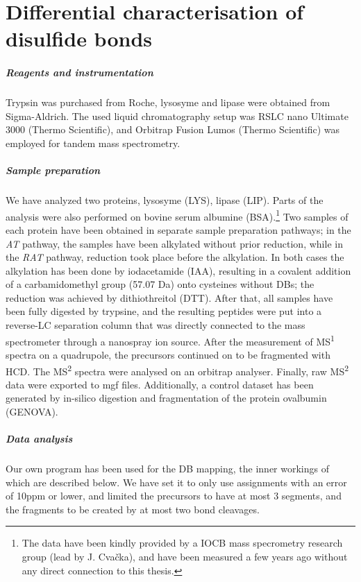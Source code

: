 \chapter{Differential characterisation of disulfide bonds}\label{chap:methods}

\paragraph{Reagents and instrumentation} Trypsin was purchased from Roche, lyso\-syme and lipase were obtained from Sigma-Aldrich. The used liquid chromatography setup was RSLC nano Ultimate 3000 (Thermo Scientific), and Orbitrap Fusion Lumos (Thermo Scientific) was employed for tandem mass spectrometry.

\paragraph{Sample preparation} We have analyzed two proteins, lysosyme (LYS), lipase (LIP). Parts of the analysis were also performed on bovine serum albumine (BSA).\footnote{The data have been kindly provided by a IOCB mass specrometry research group (lead by J. Cvačka), and have been measured a few years ago without any direct connection to this thesis.} Two samples of each protein have been obtained in separate sample preparation pathways; in the \emph{AT} pathway, the samples have been alkylated without prior reduction, while in the \emph{RAT} pathway, reduction took place before the alkylation. In both cases the alkylation has been done by iodacetamide (IAA), resulting in a covalent addition of a carbamidomethyl group (57.07 Da) onto cysteines without DBs; the reduction was achieved by dithiothreitol (DTT). After that, all samples have been fully digested by trypsine, and the resulting peptides were put into a reverse-LC separation column that was directly connected to the mass spectrometer through a nanospray ion source. After the measurement of MS\textsuperscript{1} spectra on a quadrupole, the precursors continued on to be fragmented with HCD\@. The MS\textsuperscript{2} spectra were analysed on an orbitrap analyser. Finally, raw MS\textsuperscript{2} data were exported to mgf files. Additionally, a control dataset has been generated by in-silico digestion and fragmentation of the protein ovalbumin (GENOVA).

\paragraph{Data analysis} Our own program has been used for the DB mapping, the inner workings of which are described below. We have set it to only use assignments with an error of 10ppm or lower, and limited the precursors to have at most 3 segments, and the fragments to be created by at most two bond cleavages.


